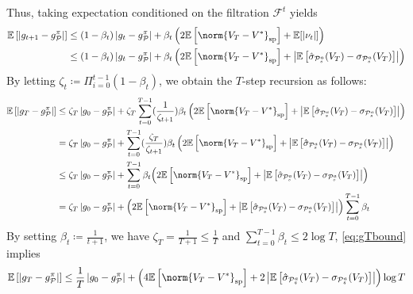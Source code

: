 Thus, taking expectation conditioned on the filtration $\mathcal{F}^t$ yields
\begin{align}
    \E\left[\abs{g_{t+1}-g^\pi_\cp}\right]&\leq(1-\beta_t)\abs{g_{t}-g^\pi_\cp}  +\beta_t\left(2\E\left[\norm{V_T-V^*}_{\mathrm{sp}}\right] + \E[\abs{\nu_t}]\right)\nonumber\\
    &\leq(1-\beta_t)\abs{g_{t}-g^\pi_\cp}  +\beta_t\left(2\E\left[\norm{V_T-V^*}_{\mathrm{sp}}\right] + \abs{\mathbb{E}\left[\hat{\sigma}_{\cp^a_s}(V_T) - {\sigma}_{\cp^a_s}(V_T)\right] }\right)
\end{align}
By letting $\zeta_t \coloneqq \Pi_{i=0}^{t-1}(1-\beta_t)$, we obtain the $T$-step recursion as follows:
\begin{align}
    \E\left[\abs{g_{T}-g^\pi_\cp}\right]&\leq\zeta_T\abs{g_0-g^\pi_\cp}+ \zeta_T \sum_{t=0}^{T-1} (\frac{1}{\zeta_{t+1}})\beta_t\left(2\E\left[\norm{V_T-V^*}_{\mathrm{sp}}\right]  + \abs{\mathbb{E}\left[\hat{\sigma}_{\cp^a_s}(V_T) - {\sigma}_{\cp^a_s}(V_T)\right] }\right) \nonumber\\
        & = \zeta_T\abs{g_0-g^\pi_\cp} +  \sum_{t=0}^{T-1} (\frac{\zeta_T}{\zeta_{t+1}})\beta_t\left(2\E\left[\norm{V_T-V^*}_{\mathrm{sp}}\right]  + \abs{\mathbb{E}\left[\hat{\sigma}_{\cp^a_s}(V_T) - {\sigma}_{\cp^a_s}(V_T)\right] }\right) \nonumber\\
          & \leq \zeta_T\abs{g_0-g^\pi_\cp} +  \sum_{t=0}^{T-1} \beta_t{\left(2\E\left[\norm{V_T-V^*}_{\mathrm{sp}}\right]  + \abs{\mathbb{E}\left[\hat{\sigma}_{\cp^a_s}(V_T) - {\sigma}_{\cp^a_s}(V_T)\right] }\right) }\nonumber\\
          & = \zeta_T\abs{g_0-g^\pi_\cp} + \left(2\E\left[\norm{V_T-V^*}_{\mathrm{sp}}\right]  + \abs{\mathbb{E}\left[\hat{\sigma}_{\cp^a_s}(V_T) - {\sigma}_{\cp^a_s}(V_T)\right] }\right)  \sum_{t=0}^{T-1} \beta_t \label{eq:gTbound}
\end{align}
By setting $\beta_t\coloneqq\frac{1}{t+1}$, we have $\zeta_T= \frac{1}{T+1}\leq\frac{1}{T}$ and $ \sum_{t=0}^{T-1} \beta_t\leq 2\log T$, \eqref{eq:gTbound} implies
\begin{equation} \label{eq:gresult}
    \E\left[\abs{g_{T}-g^\pi_\cp}\right]\leq \frac{1}{T}\abs{g_0-g^\pi_\cp} + \left(4\E\left[\norm{V_T-V^*}_{\mathrm{sp}}\right] + 2\abs{\mathbb{E}\left[\hat{\sigma}_{\cp^a_s}(V_T) - {\sigma}_{\cp^a_s}(V_T)\right] }\right)  \log T
\end{equation}


